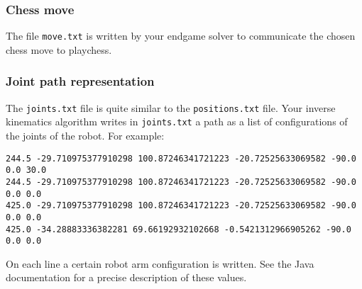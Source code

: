 \documentclass[10pt]{scrartcl}
\begin{document}
\subsubsection{Chess move}
The file \verb|move.txt| is written by your endgame solver to
communicate the chosen chess move to {\ttfamily playchess}.

\begin{comment}
\subsubsection{Forcing tree}
The file \verb|forcingTree.pl| is also written by the Prolog endgame
solver (see section \ref{sec:Endgames} of this manual). It is used to store the forcing tree, for the next move (the
endgame solver is called for each chess move separately). You could also
change it while playing a game for debugging purposes.

\subsubsection{Cartesian path representation}
The Java path plan algorithm produces a list of Cartesian positions of
the robot gripper and puts these in the file \verb|positions.txt|. For
example: 
\begin{verbatim}
124.279671 313.029663 37.500000 4.188790 30.000000
124.279671 313.029663 37.500000 4.188790 0.000000
124.279671 313.029663 218.000000 4.188790 0.000000
13.937696 427.147583 218.000000 4.188790 0.000000
13.937696 427.147583 58.000000 4.188790 0.000000
\end{verbatim}
On each line a different gripper position is described using the
$x$-, $y$-, $z$-coordinate of the tip of the gripper, the roll of the
gripper and the angle between the two gripper elements respectively.
\end{comment}

\subsubsection{Joint path representation}
The \verb|joints.txt| file is quite similar to the \verb|positions.txt|
file. Your inverse kinematics algorithm writes in \verb|joints.txt|
a path as a list of configurations of the joints of the robot. For
example:
\begin{verbatim}
244.5 -29.710975377910298 100.87246341721223 -20.72525633069582 -90.0 0.0 30.0
244.5 -29.710975377910298 100.87246341721223 -20.72525633069582 -90.0 0.0 0.0
425.0 -29.710975377910298 100.87246341721223 -20.72525633069582 -90.0 0.0 0.0
425.0 -34.28883336382281 69.66192932102668 -0.5421312966905262 -90.0 0.0 0.0
\end{verbatim}
On each line a certain robot arm configuration is written. See the Java
documentation for a precise description of these values.
\end{document}
